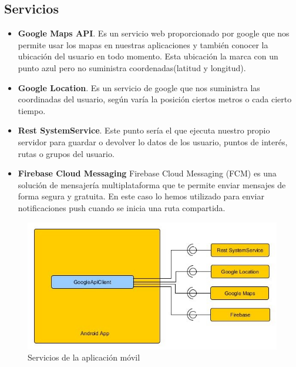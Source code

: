 \subsection{Servicios}
\begin{itemize}
\item \textbf{Google Maps API}. Es un servicio web proporcionado por google que nos permite usar los mapas en nuestras aplicaciones y también conocer la ubicación del usuario  en todo momento. Esta ubicación la marca con un punto azul pero no suministra coordenadas(latitud y longitud).
\item \textbf{Google Location}. Es un servicio de google que nos suministra las coordinadas del usuario, según varía la posición ciertos metros o cada cierto tiempo.
\item \textbf{Rest SystemService}. Este punto sería el que ejecuta nuestro propio servidor para guardar o devolver lo datos de los usuario, puntos de interés, rutas o grupos del usuario.
\item \textbf{Firebase Cloud Messaging} Firebase Cloud Messaging (FCM) es una solución de mensajería multiplataforma que te permite enviar mensajes de forma segura y gratuita. En este caso lo hemos utilizado para enviar notificaciones push cuando se inicia una ruta compartida.
\end{itemize}
\begin{figure}[H]
		\centering
		\includegraphics[width=\textwidth] {arquitectura-movil.jpg}
		\caption{Servicios de la aplicación móvil }
		\label{fig:arquitectura-movil}
	\end{figure}
	
	
